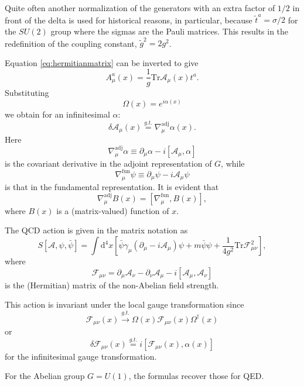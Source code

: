 \par Quite often another normalization of the generators with an extra factor
of $1/2$ in front of the delta is used for historical reasons, in particular,
because $\tilde{t}^a = \sigma/2$ for the $SU(2)$ group where the sigmas are the
Pauli matrices. This results in the redefinition of the coupling constant,
$\tilde{g}^2 = 2g^2$.
\par Equation \eqref{eq:hermitianmatrix} can be inverted to give
\begin{equation}
A_\mu^a(x) = \frac{1}{g}\mathrm{Tr}\mathcal{A}_\mu(x)t^a.
\end{equation}
Substituting
\begin{equation}
  \Omega(x) = e^{i\alpha(x)}
\end{equation}
we obtain for an infinitesimal $\alpha$:
\begin{equation}
  \delta\mathcal{A}_\mu(x)\stackrel{g.t.}{=}
  \nabla_\mu^{\mathrm{adj}}\alpha(x).
\end{equation}
Here
\begin{equation}
  \nabla^{\mathrm{adj}}_\mu\alpha \equiv \partial_\mu\alpha
  - i\left[\mathcal{A}_\mu,\alpha\right]
\end{equation}
is the covariant derivative in the adjoint representation of $G$, while
\begin{equation}
  \nabla^{\mathrm{fun}}_\mu \psi \equiv \partial_\mu\psi
  - i\mathcal{A}_\mu\psi
\end{equation}
is that in the fundamental representation. It is evident that
\begin{equation}
  \nabla_\mu^{\mathrm{adj}}B(x) = \left[\nabla^{\mathrm{fun}}_\mu, B(x)\right],
\end{equation}
where $B(x)$ is a (matrix-valued) function of $x$.
\par The QCD action is given in the matrix notation as
\begin{equation}
  S\left[\mathcal{A},\psi,\bar{\psi}\right]
  =\int\mathrm{d}^4x\left[\bar{\psi}\gamma_\mu(\partial_\mu
    - i\mathcal{A}_\mu)\psi + m\bar{\psi}\psi
  + \frac{1}{4g^2}\mathrm{Tr}\mathcal{F}^2_{\mu\nu}\right],
\label{eq:qcdmatrixaction}
\end{equation}
where
\begin{equation}
  \mathcal{F}_{\mu\nu} = \partial_\mu\mathcal{A}_\nu
  - \partial_\nu\mathcal{A}_\mu
  - i\left[\mathcal{A}_\mu,\mathcal{A}_\nu\right]
\end{equation}
is the (Hermitian) matrix of the non-Abelian field strength.
\par This action is invariant under the local gauge transformation since
\begin{equation}
\mathcal{F}_{\mu\nu}(x)\xrightarrow{g.t.}\Omega(x)\mathcal{F}_{\mu\nu}(x)\Omega^\dagger(x)\end{equation}
or
\begin{equation}
  \delta\mathcal{F}_{\mu\nu}(x)\stackrel{g.t.}{=}
  i\left[\mathcal{F}_{\mu\nu}(x),\alpha(x)\right]
\end{equation}
for the infinitesimal gauge transformation.
\par For the Abelian group $G=U(1)$, the formulas recover those for QED.
